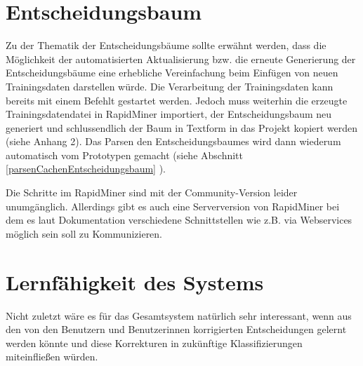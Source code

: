 \section{Entscheidungsbaum}
Zu der Thematik der Entscheidungsbäume sollte erwähnt werden, dass die Möglichkeit der automatisierten Aktualisierung bzw. die erneute Generierung der Entscheidungsbäume eine erhebliche Vereinfachung beim Einfügen von neuen Trainingsdaten darstellen würde. Die Verarbeitung der Trainingsdaten kann bereits mit einem Befehlt gestartet werden. Jedoch muss weiterhin die erzeugte Trainingsdatendatei in RapidMiner importiert, der Entscheidungsbaum neu generiert und schlussendlich der Baum in Textform in das Projekt kopiert werden (siehe Anhang 2). Das Parsen den Entscheidungsbaumes wird dann wiederum automatisch vom Prototypen gemacht (siehe Abschnitt \ref{parsenCachenEntscheidungsbaum} ). 

Die Schritte im RapidMiner sind mit der Community-Version leider unumgänglich. Allerdings gibt es auch eine Serverversion von RapidMiner bei dem es laut Dokumentation verschiedene Schnittstellen wie z.B. via Webservices möglich sein soll zu Kommunizieren. 

\section{Lernfähigkeit des Systems}
Nicht zuletzt wäre es für das Gesamtsystem natürlich sehr interessant, wenn aus den von den Benutzern und Benutzerinnen korrigierten Entscheidungen gelernt werden könnte und diese Korrekturen in zukünftige Klassifizierungen miteinfließen würden. 
